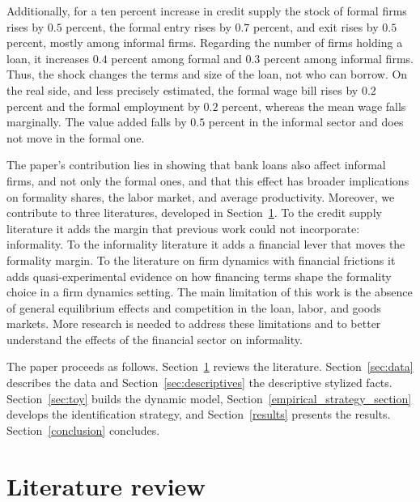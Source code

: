 \documentclass[12pt]{article}
\begin{document}
Additionally, for a ten percent increase in credit supply the stock of formal firms rises by $0.5$ percent, the formal entry rises by $0.7$ percent, and exit rises by $0.5$ percent, mostly among informal firms. Regarding the number of firms holding a loan, it increases $0.4$ percent among formal and $0.3$ percent among informal firms. Thus, the shock changes the terms and size of the loan, not who can borrow. On the real side, and less precisely estimated, the formal wage bill rises by $0.2$ percent and the formal employment by $0.2$ percent, whereas the mean wage falls marginally. The value added falls by $0.5$ percent in the informal sector and does not move in the formal one.

The paper's contribution lies in showing that bank loans also affect informal firms, and not only the formal ones, and that this effect has broader implications on formality shares, the labor market, and average productivity. Moreover, we contribute to three literatures, developed in Section~\ref{2}. To the credit supply literature it adds the margin that previous work could not incorporate: informality. To the informality literature it adds a financial lever that moves the formality margin. To the literature on firm dynamics with financial frictions it adds quasi-experimental evidence on how financing terms shape the formality choice in a firm dynamics setting. The main limitation of this work is the absence of general equilibrium effects and competition in the loan, labor, and goods markets. More research is needed to address these limitations and to better understand the effects of the financial sector on informality.

The paper proceeds as follows. Section~\ref{2} reviews the literature. Section~\ref{sec:data} describes the data and Section~\ref{sec:descriptives} the descriptive stylized facts. Section~\ref{sec:toy} builds the dynamic model, Section~\ref{empirical_strategy_section} develops the identification strategy,  and Section~\ref{results} presents the results. Section~\ref{conclusion} concludes.

\section{Literature review} \label{2}
\end{document}

